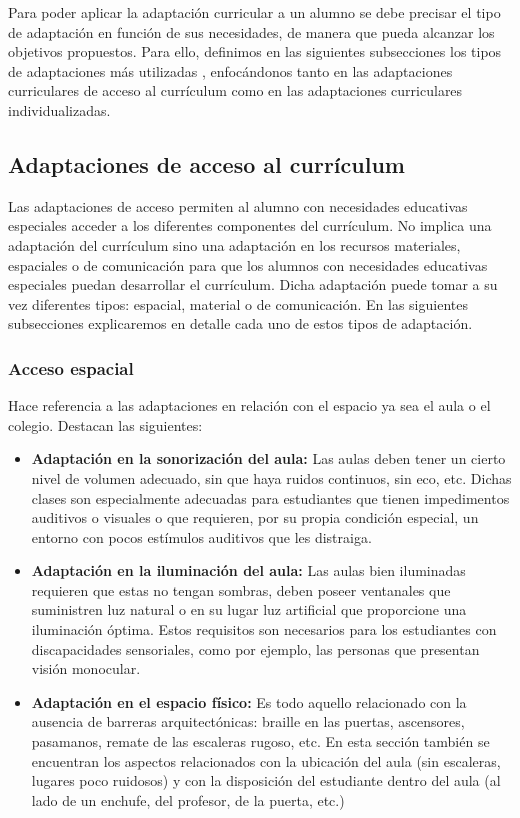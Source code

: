 Para poder aplicar la adaptación curricular a un alumno se debe precisar el tipo de adaptación en función de sus necesidades, de manera que pueda alcanzar los objetivos propuestos. Para ello, definimos en las siguientes subsecciones los tipos de adaptaciones más utilizadas \citep*{adaptacionUNED}, enfocándonos tanto en las adaptaciones curriculares de acceso al currículum como en las adaptaciones curriculares individualizadas.
\newline

\subsection{Adaptaciones de acceso al currículum}
\label{adaptacionesAcceso}
Las adaptaciones de acceso permiten al alumno con necesidades educativas especiales acceder a los diferentes componentes del currículum. No implica una adaptación del currículum sino una adaptación en los recursos materiales, espaciales o de comunicación para que los alumnos con necesidades educativas especiales puedan desarrollar el currículum. Dicha adaptación puede tomar a su vez diferentes tipos: espacial, material o de comunicación. En las siguientes subsecciones explicaremos en detalle cada uno de estos tipos de adaptación.

\subsubsection{Acceso espacial}
Hace referencia a las adaptaciones en relación con el espacio ya sea el aula o el colegio. Destacan las siguientes:
\begin{itemize}
    \item \textbf{Adaptación en la sonorización del aula:} Las aulas deben tener un cierto nivel de volumen adecuado, sin que haya ruidos continuos, sin eco, etc. Dichas clases son especialmente adecuadas para estudiantes que tienen impedimentos auditivos o visuales o que requieren, por su propia condición especial, un entorno con pocos estímulos auditivos que les distraiga.
    \item \textbf{Adaptación en la iluminación del aula:} Las aulas bien iluminadas requieren que estas no tengan sombras, deben poseer ventanales que suministren luz natural o en su lugar luz artificial que proporcione una iluminación óptima. Estos requisitos son necesarios para los estudiantes con discapacidades sensoriales, como por ejemplo, las personas que presentan visión monocular.
    \item \textbf{Adaptación en el espacio físico:} Es todo aquello relacionado con la ausencia de barreras arquitectónicas:  braille en las puertas, ascensores, pasamanos, remate de las escaleras rugoso, etc. En esta sección también se encuentran los aspectos relacionados con la ubicación del aula (sin escaleras, lugares poco ruidosos) y con la disposición del estudiante dentro del aula (al lado de un enchufe, del profesor, de la puerta, etc.)
\end{itemize}

